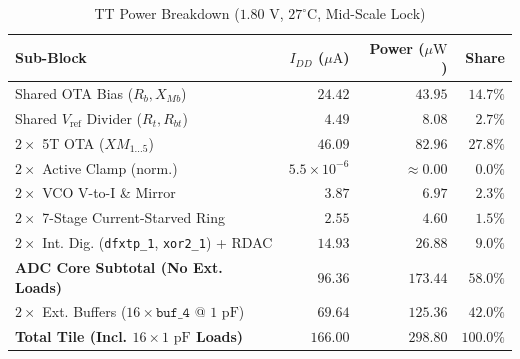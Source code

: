 \documentclass[10pt,twocolumn,letterpaper]{article}
\begin{document}
\begin{table}[t]
\centering
\caption{TT Power Breakdown ($1.80\text{ V}$, $27^\circ\text{C}$, Mid-Scale Lock)}
\label{tab:pwr}
\scriptsize
\setlength{\tabcolsep}{3.0pt}
\begin{tabular}{@{}lrrr@{}}
\toprule
\textbf{Sub-Block} & \textbf{$I_{DD}$ ($\mu\text{A}$)} & \textbf{Power ($\mu\text{W}$)} & \textbf{Share} \\
\midrule
Shared OTA Bias ($R_b, X_{Mb}$) & $24.42$ & $43.95$ & $14.7\%$ \\
Shared $V_{\text{ref}}$ Divider ($R_t, R_{bt}$) & $4.49$ & $8.08$ & $2.7\%$ \\
$2\times$ 5T OTA ($XM_{1\dots5}$) & $46.09$ & $82.96$ & $27.8\%$ \\
$2\times$ Active Clamp (norm.) & $5.5\times10^{-6}$ & $\approx0.00$ & $\mathbf{0.0\%}$ \\
$2\times$ VCO V-to-I \& Mirror & $3.87$ & $6.97$ & $2.3\%$ \\
$2\times$ 7-Stage Current-Starved Ring & $2.55$ & $4.60$ & $1.5\%$ \\
$2\times$ Int. Dig. (\texttt{dfxtp\_1}, \texttt{xor2\_1}) + RDAC & $14.93$ & $26.88$ & $9.0\%$ \\
\midrule
\textbf{ADC Core Subtotal (No Ext. Loads)} & $\mathbf{96.36}$ & $\mathbf{173.44}$ & $\mathbf{58.0\%}$ \\
$2\times$ Ext. Buffers ($16\times\texttt{buf\_4}$ @ $1\text{ pF}$) & $69.64$ & $125.36$ & $42.0\%$ \\
\midrule
\textbf{Total Tile (Incl. $16\times1\text{ pF}$ Loads)} & $\mathbf{166.00}$ & $\mathbf{298.80}$ & $\mathbf{100.0\%}$ \\
\bottomrule
\end{tabular}
\end{table}
\end{document}
